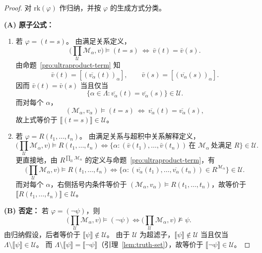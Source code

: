 \documentclass[lang=cn,a4paper,newtx,section]{elegantbook}
\begin{document}
\begin{proof}
对 $\mathrm{rk}(\varphi)$ 作归纳，并按 $\varphi$ 的生成方式分类。

\textbf{(A) 原子公式：} 
\begin{enumerate}
  \item 若 $\varphi=(t=s)$。
  由满足关系定义，
  \[
    \bigl(\prod_{\mathcal U}\mathcal M_{\alpha},v\bigr)\models(t=s)\ \Longleftrightarrow\ \bar v(t)=\bar v(s).
  \]
  由命题~\ref{pro:ultraproduct-term} 知
  \[
    \bar v(t)=[(\overline{v_{\alpha}}(t))_{\alpha}],\qquad \bar v(s)=[(\overline{v_{\alpha}}(s))_{\alpha}].
  \]
  因而 $\bar v(t)=\bar v(s)$ 当且仅当
  \[
    \{\alpha\in\Lambda: \overline{v_{\alpha}}(t)=\overline{v_{\alpha}}(s)\}\in\mathcal U.
  \]
  而对每个 $\alpha$，
  \[
    (\mathcal M_{\alpha},v_{\alpha})\models(t=s)\ \Longleftrightarrow\ \overline{v_{\alpha}}(t)=\overline{v_{\alpha}}(s),
  \]
  故上式等价于 $\llbracket(t=s)\rrbracket\in\mathcal U$。

  \item 若 $\varphi=R(t_1,\dots,t_n)$。
  由满足关系与超积中关系解释定义，
  \[
    \bigl(\prod_{\mathcal U}\mathcal M_{\alpha},v\bigr)\models R(t_1,\dots,t_n)
    \Longleftrightarrow
    \{\alpha:(\bar v(t_1),\dots,\bar v(t_n))\ \text{在 }\mathcal M_{\alpha}\ \text{处满足 }R\}\in\mathcal U.
  \]
  更直接地，由 $R^{\prod_{\mathcal U}\mathcal M_{\alpha}}$ 的定义与命题~\ref{pro:ultraproduct-term}，有
  \[
    \bigl(\prod_{\mathcal U}\mathcal M_{\alpha},v\bigr)\models R(t_1,\dots,t_n)
    \Longleftrightarrow
    \{\alpha:(\overline{v_{\alpha}}(t_1),\dots,\overline{v_{\alpha}}(t_n))\in R^{\mathcal M_{\alpha}}\}\in\mathcal U.
  \]
  而对每个 $\alpha$，右侧括号内条件等价于 $(\mathcal M_{\alpha},v_{\alpha})\models R(t_1,\dots,t_n)$，故等价于 $\llbracket R(t_1,\dots,t_n)\rrbracket\in\mathcal U$。
\end{enumerate}

\textbf{(B) 否定：}
若 $\varphi=(\neg\psi)$，则
\[
  \bigl(\prod_{\mathcal U}\mathcal M_{\alpha},v\bigr)\models(\neg\psi)\Longleftrightarrow\bigl(\prod_{\mathcal U}\mathcal M_{\alpha},v\bigr)\not\models\psi.
\]
由归纳假设，后者等价于 $\llbracket\psi\rrbracket\notin\mathcal U$。
由于 $\mathcal U$ 为超滤子，$\llbracket\psi\rrbracket\notin\mathcal U$ 当且仅当 $\Lambda\setminus\llbracket\psi\rrbracket\in\mathcal U$。
而 $\Lambda\setminus\llbracket\psi\rrbracket=\llbracket\neg\psi\rrbracket$（引理~\ref{lem:truth-set}），故等价于 $\llbracket\neg\psi\rrbracket\in\mathcal U$。


\end{proof}
\end{document}
